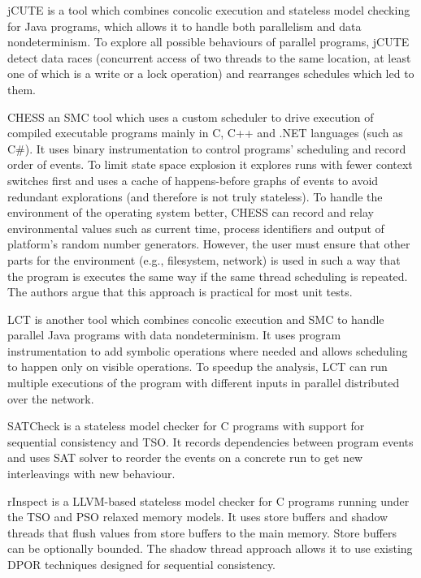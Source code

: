 jCUTE  is a tool which combines concolic execution and stateless model checking for Java programs, which allows it to handle both parallelism and data nondeterminism.
To explore all possible behaviours of parallel programs, jCUTE detect data races (concurrent access of two threads to the same location, at least one of which is a write or a lock operation) and rearranges schedules which led to them.

CHESS  an SMC tool which uses a custom scheduler to drive execution of compiled executable programs mainly in C, C++ and .NET languages (such as C\#).
It uses binary instrumentation to control programs' scheduling and record order of events.
To limit state space explosion it explores runs with fewer context switches first and uses a cache of happens-before graphs of events to avoid redundant explorations (and therefore is not truly stateless).
To handle the environment of the operating system better, CHESS can record and relay environmental values such as current time, process identifiers and output of platform's random number generators.
However, the user must ensure that other parts for the environment (e.g., filesystem, network) is used in such a way that the program is executes the same way if the same thread scheduling is repeated.
The authors argue that this approach is practical for most unit tests.

LCT  is another tool which combines concolic execution and SMC to handle parallel Java programs with data nondeterminism.
It uses program instrumentation to add symbolic operations where needed and allows scheduling to happen only on visible operations.
To speedup the analysis, LCT can run multiple executions of the program with different inputs in parallel distributed over the network.

SATCheck  is a stateless model checker for C programs with support for sequential consistency and TSO.
It records dependencies between program events and uses SAT solver to reorder the events on a concrete run to get new interleavings with new behaviour.

rInspect  is a LLVM-based stateless model checker for C
programs running under the TSO and PSO relaxed memory models.
It uses store buffers and shadow threads that flush values from store buffers
to the main memory.
Store buffers can be optionally bounded.
The shadow thread approach allows it to use existing DPOR techniques designed
for sequential consistency.

